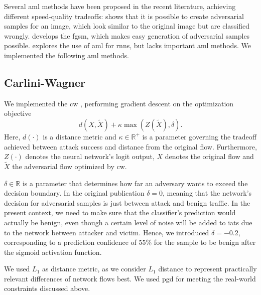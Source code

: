 \documentclass[conference]{IEEEtran}
\begin{document}
Several \gls{aml} methods have been proposed in the recent literature, achieving different speed-quality tradeoffs:
\cite{szegedy_intriguing_2014} shows that it is possible to create adversarial samples for an image, which look similar to the original image but are classified wrongly. \cite{goodfellow_explaining_2015} develops the \gls{fgsm}, which makes easy generation of adversarial samples possible. \cite{papernot_crafting_2016} explores the use of \gls{aml} for \glspl{rnn}, but lacks important \gls{aml} methods. %
We implemented the following \gls{aml} methods.

\subsection{Carlini-Wagner}
We implemented the \gls{cw} \cite{carlini_towards_2017}, performing gradient descent on the optimization objective
\begin{equation} \label{eq:carliniWagner}
d(X,\tilde X) + \kappa  \max(Z(\tilde X), \delta).
\end{equation}
Here, $d(\cdot)$ is a distance metric and $\kappa \in \mathbb R^+$ is a parameter governing the tradeoff achieved between attack success and distance from the original flow. Furthermore, $Z(\cdot)$ denotes the neural network's logit output, $X$ denotes the original flow and $\tilde X$ the adversarial flow optimized by \gls{cw}.

$\delta \in \mathbb R$ is a parameter that determines how far an adversary wants to exceed the decision boundary.
In the original publication $\delta=0$, meaning that the network's decision for adversarial samples is just between attack and benign traffic. In the present context, we need to make sure that the classifier's prediction would actually be benign, even though a certain level of noise will be added to \glspl{iat} due to the network between attacker and victim. Hence, we introduced $\delta=-0.2$, corresponding to a prediction confidence of 55\% for the sample to be benign after the sigmoid activation function.

We used $L_1$ as distance metric, as we consider $L_1$ distance to represent practically relevant differences of network flows best. We used \gls{pgd} for meeting the real-world constraints discussed above.
\end{document}
